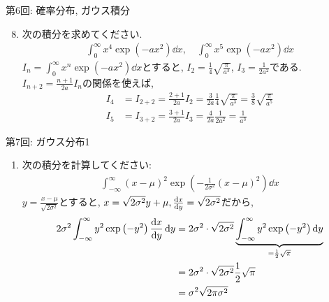 \documentclass[dvipdfmx,notheorems,t]{beamer}
\begin{document}
\begin{frame}{第6回: 確率分布, ガウス積分}
\begin{enumerate}
  \setcounter{enumi}{7}
  \item 次の積分を求めてください.
  \begin{align*}
    \int_0^\infty x^4 \exp(-a x^2) \dd{x}, \quad \int_0^\infty x^5 \exp(-a x^2) \dd{x}
  \end{align*}
  $I_n = \int_0^\infty x^n \exp(-a x^2) \dd{x}$とすると, $I_2 = \frac{1}{4} \sqrt{\frac{\pi}{a^3}}$,
  $I_3 = \frac{1}{2 a^2}$である.
  $I_{n + 2} = \frac{n + 1}{2a} I_n$の関係を使えば,
  \begin{align*}
    I_4 &= I_{2 + 2} = \frac{2 + 1}{2a} I_2 = \frac{3}{2a} \frac{1}{4} \sqrt{\frac{\pi}{a^3}}
      = \frac{3}{8} \sqrt{\frac{\pi}{a^5}} \\
    I_5 &= I_{3 + 2} = \frac{3 + 1}{2a} I_3 = \frac{4}{2a} \frac{1}{2 a^2}
      = \frac{1}{a^3}
  \end{align*}
\end{enumerate}
\end{frame}

\begin{frame}{第7回: ガウス分布1}
\begin{enumerate}
  \item 次の積分を計算してください:
  \begin{align*}
    \int_{-\infty}^\infty (x - \mu)^2
      \exp \left( -\frac{1}{2 \sigma^2} \left( x - \mu \right)^2 \right) \dd{x}
  \end{align*}
  $y = \frac{x - \mu}{\sqrt{2 \sigma^2}}$とすると,
  $x = \sqrt{2 \sigma^2} y + \mu, \dv{x}{y} = \sqrt{2 \sigma^2}$だから,
  \begin{align*}
    2 \sigma^2 \int_{-\infty}^\infty y^2 \exp \left( -y^2 \right) \dv{x}{y} \dd{y}
      &= 2 \sigma^2 \cdot \sqrt{2 \sigma^2}
        \underbrace{\int_{-\infty}^\infty y^2 \exp \left( -y^2 \right) \dd{y}}_{= \frac{1}{2} \sqrt{\pi}} \\
      &= 2 \sigma^2 \cdot \sqrt{2 \sigma^2} \frac{1}{2} \sqrt{\pi} \\
      &= \sigma^2 \sqrt{2 \pi \sigma^2}
  \end{align*}
\end{enumerate}
\end{frame}
\end{document}
